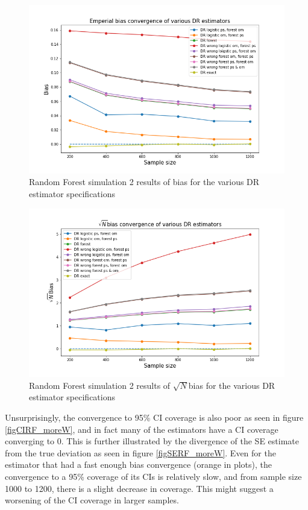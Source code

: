 \documentclass[12pt,twoside]{article}
\begin{document}
\begin{figure}[h!]
    \centering
    \includegraphics[width = 0.9\columnwidth]{figures/biasRF_moreW.png}
    \caption{Random Forest simulation 2 results of bias for the various DR estimator specifications}
    \label{figbiasRF_moreW}
\end{figure}

\begin{figure}[h!]
    \centering
    \includegraphics[width = 0.9\columnwidth]{figures/sqrtnRF_moreW.png}
    \caption{Random Forest simulation 2 results of $\sqrt{N}$bias for the various DR estimator specifications}
    \label{figsqrtnRF_moreW}
\end{figure}

Unsurprisingly, the convergence to 95\% CI coverage is also poor as seen in figure \ref{figCIRF_moreW}, and in fact many of the estimators have a CI coverage converging to 0. This is further illustrated by the divergence of the SE estimate from the true deviation as seen in figure \ref{figSERF_moreW}. Even for the estimator that had a fast enough bias convergence (orange in plots), the convergence to a 95\% coverage of its CIs is relatively slow, and from sample size 1000 to 1200, there is a slight decrease in coverage. This might suggest a worsening of the CI coverage in larger samples.
\end{document}
